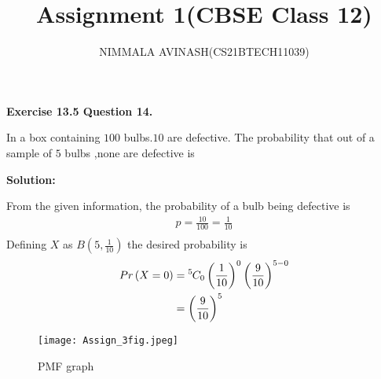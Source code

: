 \documentclass[journal,twocolumn]{IEEEtran}
\title{Assignment 1(CBSE Class 12)}
\author{NIMMALA AVINASH(CS21BTECH11039)}
\providecommand{\brak}[1]{\ensuremath{\left(#1\right)}}
\newcommand*{\permcomb}[4][0mu]{{{}^{#3}\mkern#1#2_{#4}}}
\newcommand*{\comb}[1][-1mu]{\permcomb[#1]{C}}
\begin{document}
\maketitle

{\Large \textbf{Exercise 13.5 Question 14.}}

\begin{Large}

In a box containing $100$ bulbs.$10$ are defective. The probability that out of a sample of $5$ bulbs ,none are defective is \\

\end{Large}

{\Large \textbf{Solution:}\\}
\begin{Large}
From the given information, the probability of a bulb being defective is
\begin{align}
p = \frac{10}{100} = \frac{1}{10}\\
\end{align}
Defining $X$ as $B \brak{5,\frac{1}{10}}$  the desired probability is\\
\begin{align}
    Pr\brak{X=0} &= \comb{5}{0} \brak{\frac{1}{10}}^{0} \brak{\frac{9}{10}} ^ {5-0}\\
    &= \brak{\frac{9}{10}}^5
\end{align}
\begin{figure}[h]
\centering
    \texttt{[image: Assign\_3fig.jpeg]}
    \caption{PMF graph}
    \label{fig 1}
\end{figure}
\end{Large}
\end{document}
